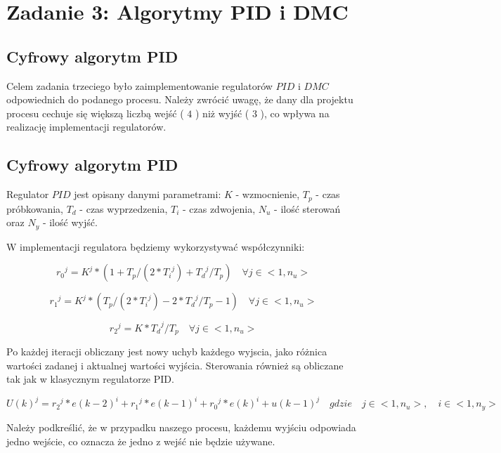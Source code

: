 \chapter{Zadanie 3: Algorytmy PID i DMC}
\section{Cyfrowy algorytm PID}

Celem zadania trzeciego było zaimplementowanie regulatorów $PID$ i $DMC$ odpowiednich do podanego procesu. Należy zwrócić uwagę, że dany dla projektu procesu
cechuje się większą liczbą wejść ( $4$ ) niż wyjść ( $3$ ), co wpływa na realizację implementacji regulatorów.

\section{Cyfrowy algorytm PID}
 
Regulator $PID$ jest opisany danymi parametrami: $K$ - wzmocnienie, $T_p$ - czas próbkowania, $T_d$ - czas wyprzedzenia, $T_i$ - czas zdwojenia, $N_u$ - ilość sterowań oraz $N_y$ - ilość wyjść.

W implementacji regulatora będziemy wykorzystywać współczynniki:

\begin{equation}
{r_0}^j=K^j*(1+T_p/(2*{T_i}^j)+{T_d}^j/T_p) \quad \forall j \in <1,n_u>
\label{r0}
\end{equation}


\begin{equation}
{r_1}^j=K^j*(T_p/(2*{T_i}^j)-2*{T_d}^j/T_p-1) \quad \forall j \in <1,n_u> 
\label{r1}
\end{equation}

\begin{equation}
{r_2}^j=K*{T_d}^j/T_p \quad \forall j \in <1,n_u>
\label{r2}
\end{equation}

Po każdej iteracji obliczany jest nowy uchyb każdego wyjscia, jako różnica wartości zadanej i aktualnej wartości wyjścia. 
Sterowania również są obliczane tak jak w klasycznym regulatorze PID.

\begin{equation}
U(k)^j = {r_2}^j*e(k-2)^i + {r_1}^j*e(k-1)^i + {r_0}^j*e(k)^i + u(k-1)^j \quad gdzie \quad j \in <1,n_u>, \quad i \in <1,n_y>
\label{Uk}
\end{equation}

Należy podkreślić, że w przypadku naszego procesu, każdemu wyjściu odpowiada jedno wejście, co oznacza że jedno z wejść nie będzie używane.


